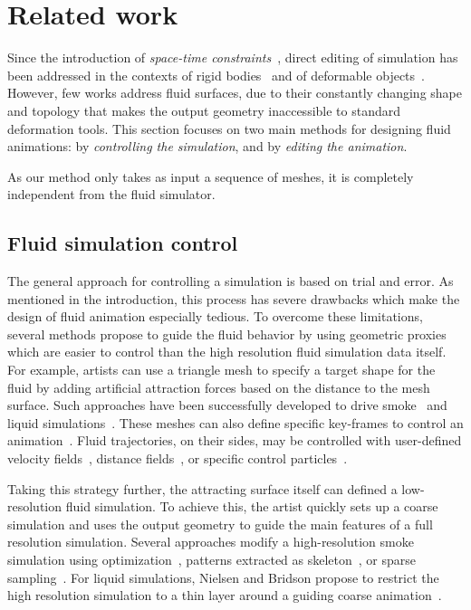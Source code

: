 \section{Related work}\label{sec:related_work}

Since the introduction of \emph{space-time constraints}~\cite{Witkin1988}, direct editing of simulation has been addressed in the contexts of rigid bodies~\cite{Popovic2000,Chenney2000,Twigg2007} and of deformable objects~\cite{wojtan2006keyframe,Barbic2009,Barbic2012,Schulz2014,Li2014}.
However, few works address fluid surfaces, due to their constantly changing shape and topology that makes the output geometry inaccessible to standard deformation tools.
This section focuses on two main methods for designing fluid animations: by \emph{controlling the simulation}, and by \emph{editing the animation}. 

As our method only takes as input a sequence of meshes, it is completely independent from the fluid simulator.

\subsection{Fluid simulation control}
The general approach for controlling a simulation is based on trial and error.
As mentioned in the introduction, this process has severe drawbacks which make the design of fluid animation especially tedious. 
To overcome these limitations, several methods propose to guide the fluid behavior by using geometric proxies which are easier to control than the high resolution fluid simulation data itself.
For example, artists can use a triangle mesh to specify a target shape for the fluid by adding artificial attraction forces based on the distance to the mesh surface.
Such approaches have been successfully developed to drive smoke~\cite{Fattal2004,Hong2004,Shi2005a} and liquid simulations~\cite{Shi2005b,Raveendran2012}. 
These meshes can also define specific key-frames to control an animation~\cite{Treuille2003,McNamara2004}.
Fluid trajectories, on their sides, may be controlled with user-defined velocity fields~\cite{Kim2006:SmokeControl}, distance fields~\cite{Yang2013}, or specific control particles~\cite{Thurey2006:FluidControl,Madill2013}. 

Taking this strategy further, the attracting surface itself can defined a low-resolution fluid simulation. 
To achieve this, the artist quickly sets up a coarse simulation and uses the output geometry to guide the main features of a full resolution simulation.
Several approaches modify a high-resolution smoke simulation using optimization~\cite{Nielsen2009,Nielsen2010}, patterns extracted as skeleton~\cite{Yuan2011}, or sparse sampling~\cite{Huang2013}.
For liquid simulations, Nielsen and Bridson propose to restrict the high resolution simulation to a thin layer around a guiding coarse animation~\cite{Nielsen2011}.

